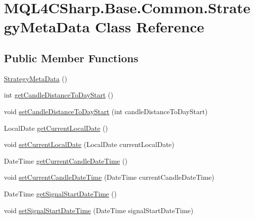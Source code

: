 \hypertarget{class_m_q_l4_c_sharp_1_1_base_1_1_common_1_1_strategy_meta_data}{}\section{M\+Q\+L4\+C\+Sharp.\+Base.\+Common.\+Strategy\+Meta\+Data Class Reference}
\label{class_m_q_l4_c_sharp_1_1_base_1_1_common_1_1_strategy_meta_data}
\subsection*{Public Member Functions}
\begin{DoxyCompactItemize}
\item 
\hyperlink{class_m_q_l4_c_sharp_1_1_base_1_1_common_1_1_strategy_meta_data_a9564f0f05dff705eadadc87fe00ac09d}{Strategy\+Meta\+Data} ()
\item 
int \hyperlink{class_m_q_l4_c_sharp_1_1_base_1_1_common_1_1_strategy_meta_data_a27ef11c730660e49c1a99960affbe394}{get\+Candle\+Distance\+To\+Day\+Start} ()
\item 
void \hyperlink{class_m_q_l4_c_sharp_1_1_base_1_1_common_1_1_strategy_meta_data_a1e10469aa3db548ade30a5159e08a430}{set\+Candle\+Distance\+To\+Day\+Start} (int candle\+Distance\+To\+Day\+Start)
\item 
Local\+Date \hyperlink{class_m_q_l4_c_sharp_1_1_base_1_1_common_1_1_strategy_meta_data_af379dbbd19cadbd6d902966dcb36529a}{get\+Current\+Local\+Date} ()
\item 
void \hyperlink{class_m_q_l4_c_sharp_1_1_base_1_1_common_1_1_strategy_meta_data_a8394a99b7f69c64c3c6b337781a0e32c}{set\+Current\+Local\+Date} (Local\+Date current\+Local\+Date)
\item 
Date\+Time \hyperlink{class_m_q_l4_c_sharp_1_1_base_1_1_common_1_1_strategy_meta_data_afa1e1b722cf031f71e47a80cafe5efe8}{get\+Current\+Candle\+Date\+Time} ()
\item 
void \hyperlink{class_m_q_l4_c_sharp_1_1_base_1_1_common_1_1_strategy_meta_data_afc5581b6f79ffeb8b1bba0aa78de05f9}{set\+Current\+Candle\+Date\+Time} (Date\+Time current\+Candle\+Date\+Time)
\item 
Date\+Time \hyperlink{class_m_q_l4_c_sharp_1_1_base_1_1_common_1_1_strategy_meta_data_adb99205fdf253beb738ff974636f7c8f}{get\+Signal\+Start\+Date\+Time} ()
\item 
void \hyperlink{class_m_q_l4_c_sharp_1_1_base_1_1_common_1_1_strategy_meta_data_adb3e5240e66d62a14cffb1e23b6c7ee9}{set\+Signal\+Start\+Date\+Time} (Date\+Time signal\+Start\+Date\+Time)

\end{DoxyCompactItemize}
